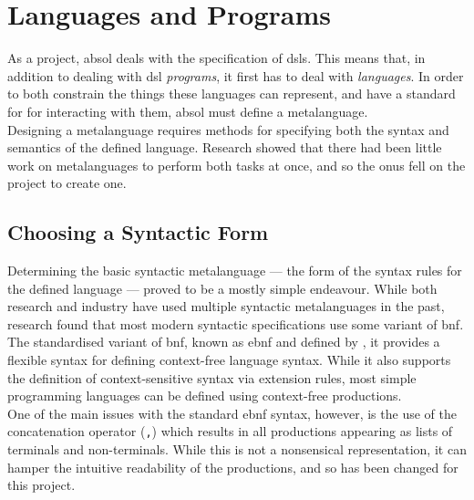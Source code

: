 

\section{Languages and Programs} %
\label{sec:languages_and_programs}
As a project, \gls{absol} deals with the specification of \glspl{dsl}. 
This means that, in addition to dealing with \gls{dsl} \textit{programs}, it first has to deal with \textit{languages}. 
In order to both constrain the things these languages can represent, and have a standard for for interacting with them, \gls{absol} must define a metalanguage. \\

Designing a metalanguage requires methods for specifying both the syntax and semantics of the defined language.
Research showed that there had been little work on metalanguages to perform both tasks at once, and so the onus fell on the project to create one. 

\subsection{Choosing a Syntactic Form} %
\label{sub:choosing_a_syntactic_form}
Determining the basic syntactic metalanguage --- the form of the syntax rules for the defined language --- proved to be a mostly simple endeavour. 
While both research and industry have used multiple syntactic metalanguages in the past, research found that most modern syntactic specifications use some variant of \gls{bnf}. \\

The standardised variant of \gls{bnf}, known as \gls{ebnf} and defined by \citet{standard1996ebnf}, it provides a flexible syntax for defining context-free language syntax. 
While it also supports the definition of context-sensitive syntax via extension rules, most simple programming languages can be defined using context-free productions. \\

One of the main issues with the standard \gls{ebnf} syntax, however, is the use of the concatenation operator (\lstinline{,}) which results in all productions appearing as lists of terminals and non-terminals.
While this is not a nonsensical representation, it can hamper the intuitive readability of the productions, and so has been changed for this project.

